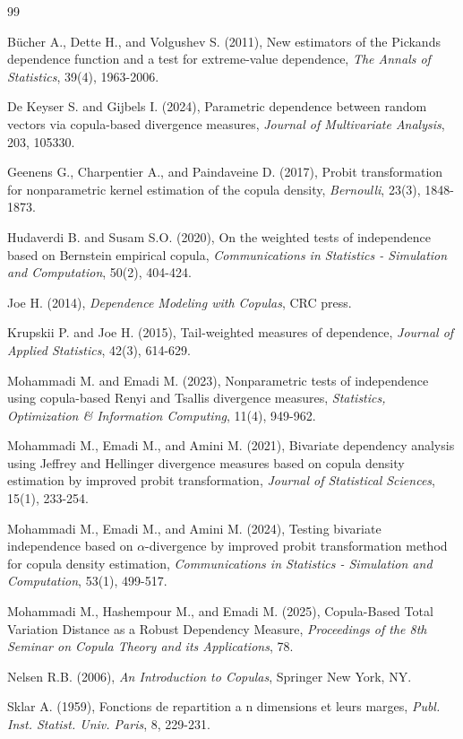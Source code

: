 \documentclass[twoside]{article}
\begin{document}
\begin{thebibliography}{99}

Bücher A., Dette H., and Volgushev S. (2011), New estimators of the Pickands dependence function and a test for extreme-value dependence, {\it The Annals of Statistics}, 39(4), 1963-2006.

De Keyser S. and Gijbels I. (2024), Parametric dependence between random vectors via copula-based divergence measures, {\it Journal of Multivariate Analysis}, 203, 105330.

Geenens G., Charpentier A., and Paindaveine D. (2017), Probit transformation for nonparametric kernel estimation of the copula density, {\it Bernoulli}, 23(3), 1848-1873.

Hudaverdi B. and Susam S.O. (2020), On the weighted tests of independence based on Bernstein empirical copula, {\it Communications in Statistics - Simulation and Computation}, 50(2), 404-424.

Joe H. (2014), {\it Dependence Modeling with Copulas}, CRC press.

Krupskii P. and Joe H. (2015), Tail-weighted measures of dependence, {\it Journal of Applied Statistics}, 42(3), 614-629.

Mohammadi M. and Emadi M. (2023), Nonparametric tests of independence using copula-based Renyi and Tsallis divergence measures, {\it Statistics, Optimization \& Information Computing}, 11(4), 949-962.

Mohammadi M., Emadi M., and Amini M. (2021), Bivariate dependency analysis using Jeffrey and Hellinger divergence measures based on copula density estimation by improved probit transformation, {\it Journal of Statistical Sciences}, 15(1), 233-254.

Mohammadi M., Emadi M., and Amini M. (2024), Testing bivariate independence based on $\alpha$-divergence by improved probit transformation method for copula density estimation, {\it Communications in Statistics - Simulation and Computation}, 53(1), 499-517.

Mohammadi M., Hashempour M., and Emadi M. (2025), Copula-Based Total Variation Distance as a Robust Dependency Measure, {\it Proceedings of the 8th Seminar on Copula Theory and its Applications}, 78.

Nelsen R.B. (2006), {\it An Introduction to Copulas}, Springer New York, NY.

Sklar A. (1959), Fonctions de repartition a n dimensions et leurs marges, {\it Publ. Inst. Statist. Univ. Paris}, 8, 229-231.

\end{thebibliography}
\end{document}
